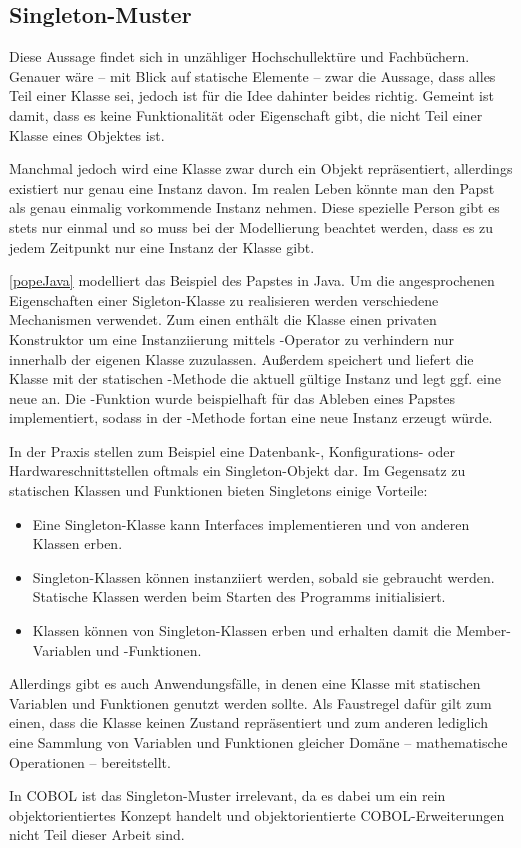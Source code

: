 \subsection{Singleton-Muster}
 \cite{susanne_hackmack_objekte_2018} Diese Aussage findet sich in unzähliger Hochschullektüre und Fachbüchern. Genauer wäre -- mit Blick auf statische Elemente -- zwar die Aussage, dass alles Teil einer Klasse sei, jedoch ist für die Idee dahinter beides richtig. Gemeint ist damit, dass es keine Funktionalität oder Eigenschaft gibt, die nicht Teil einer Klasse \bzw eines Objektes ist.

Manchmal jedoch wird eine Klasse zwar durch ein Objekt repräsentiert, allerdings existiert nur genau eine Instanz davon. Im realen Leben könnte man \zB den Papst als genau einmalig vorkommende Instanz nehmen. Diese spezielle Person gibt es stets nur einmal und so muss bei der Modellierung beachtet werden, dass es zu jedem Zeitpunkt nur eine Instanz der Klasse gibt.


\autoref{popeJava} modelliert das Beispiel des Papstes in Java. Um die angesprochenen Eigenschaften einer Sigleton-Klasse zu realisieren werden verschiedene Mechanismen verwendet. Zum einen enthält die Klasse einen privaten Konstruktor um eine Instanziierung mittels -Operator zu verhindern \bzw nur innerhalb der eigenen Klasse zuzulassen. Außerdem speichert und liefert die Klasse mit der statischen -Methode die aktuell gültige Instanz und legt ggf. eine neue an. Die -Funktion wurde beispielhaft für das Ableben eines Papstes implementiert, sodass in der -Methode fortan eine neue Instanz erzeugt würde.

In der Praxis stellen zum Beispiel eine Datenbank-, Konfigurations- oder Hardwareschnittstellen oftmals ein Singleton-Objekt dar. Im Gegensatz zu statischen Klassen und Funktionen bieten Singletons einige Vorteile:

\begin{itemize}
    \item Eine Singleton-Klasse kann Interfaces implementieren und von anderen Klassen erben.
    \item Singleton-Klassen können instanziiert werden, sobald sie gebraucht werden. Statische Klassen werden beim Starten des Programms initialisiert.
    \item Klassen können von Singleton-Klassen erben und erhalten damit die Member-Variablen und -Funktionen.
\end{itemize}

Allerdings gibt es auch Anwendungsfälle, in denen eine Klasse mit statischen Variablen und Funktionen genutzt werden sollte. Als Faustregel dafür gilt zum einen, dass die Klasse keinen Zustand repräsentiert und zum anderen lediglich eine Sammlung von Variablen und Funktionen gleicher Domäne -- \zB mathematische Operationen -- bereitstellt.

In COBOL ist das Singleton-Muster irrelevant, da es dabei um ein rein objektorientiertes Konzept handelt und objektorientierte COBOL-Erweiterungen nicht Teil dieser Arbeit sind.
